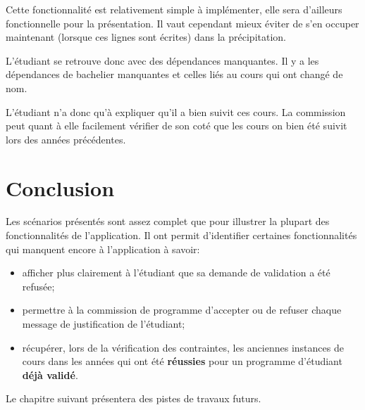 Cette fonctionnalité est relativement simple à implémenter, elle sera d'ailleurs fonctionnelle pour la présentation. Il vaut cependant mieux éviter de s'en occuper maintenant (lorsque ces lignes sont écrites) dans la précipitation. 

L'étudiant se retrouve donc avec des dépendances manquantes. Il y a les dépendances de bachelier manquantes et celles liés au cours qui ont changé de nom. 

L'étudiant n'a donc qu'à expliquer qu'il a bien suivit ces cours. La commission peut quant à elle facilement vérifier de son coté que les cours on bien été suivit lors des années précédentes.

\section{Conclusion}

Les scénarios présentés sont assez complet que pour illustrer la plupart des fonctionnalités de l'application. Il ont permit d'identifier certaines fonctionnalités qui manquent encore à l'application à savoir:
\begin{itemize}
\item afficher plus clairement à l'étudiant que sa demande de validation a été refusée;
\item permettre à la commission de programme d'accepter ou de refuser chaque message de justification de l'étudiant;
\item récupérer, lors de la vérification des contraintes, les anciennes instances de cours dans les années qui ont été  \textbf{réussies} pour un programme d'étudiant \textbf{déjà validé}.
\end{itemize}

Le chapitre suivant présentera des pistes de travaux futurs. 